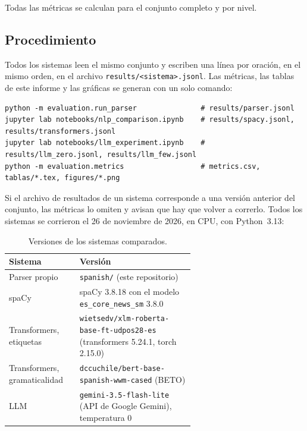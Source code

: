 Todas las métricas se calculan para el conjunto completo y por nivel.

\subsection{Procedimiento}

Todos los sistemas leen el mismo conjunto y escriben una línea por oración, en el mismo orden,
en el archivo \texttt{results/<sistema>.jsonl}. Las métricas, las tablas de este informe y
las gráficas se generan con un solo comando:
\begin{lstlisting}
python -m evaluation.run_parser               # results/parser.jsonl
jupyter lab notebooks/nlp_comparison.ipynb    # results/spacy.jsonl, results/transformers.jsonl
jupyter lab notebooks/llm_experiment.ipynb    # results/llm_zero.jsonl, results/llm_few.jsonl
python -m evaluation.metrics                  # metrics.csv, tablas/*.tex, figures/*.png
\end{lstlisting}
Si el archivo de resultados de un sistema corresponde a una versión anterior del conjunto, las
métricas lo omiten y avisan que hay que volver a correrlo.
Todos los sistemas se corrieron el 26 de noviembre de 2026, en CPU, con Python~3.13:

\begin{table}[h]
  \centering
  \small
  \begin{tabular}{lp{0.62\linewidth}}
    \toprule
    Sistema & Versión \\
    \midrule
    Parser propio & \texttt{spanish/} (este repositorio) \\
    spaCy & spaCy 3.8.18 con el modelo \texttt{es\_core\_news\_sm} 3.8.0 \\
    Transformers, etiquetas & \texttt{wietsedv/xlm-roberta-base-ft-udpos28-es} (transformers 5.24.1, torch 2.15.0) \\
    Transformers, gramaticalidad & \texttt{dccuchile/bert-base-spanish-wwm-cased} (BETO) \\
    LLM & \texttt{gemini-3.5-flash-lite} (API de Google Gemini), temperatura 0 \\
    \bottomrule
  \end{tabular}
  \caption{Versiones de los sistemas comparados.}
  \label{tab:versiones}
\end{table}

